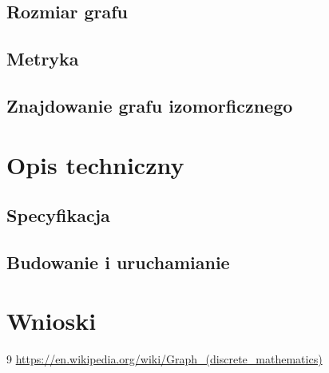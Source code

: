 \documentclass{article}
\begin{document}
\subsection{Rozmiar grafu}
\subsection{Metryka}
\subsection{Znajdowanie grafu izomorficznego}

\section{Opis techniczny}
\subsection{Specyfikacja}
\subsection{Budowanie i uruchamianie}

\section{Wnioski}

\renewcommand{\refname}{Bibliografia}
\begin{thebibliography}{9}
\url{https://en.wikipedia.org/wiki/Graph_(discrete_mathematics)}

\end{thebibliography}
\end{document}
